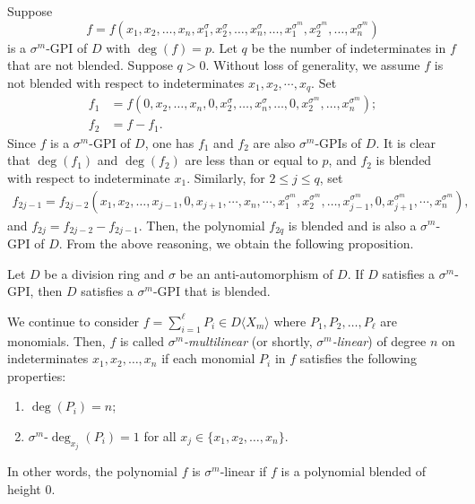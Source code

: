 \documentclass{cimart}
\begin{document}
Suppose 
\[
f=f(x_1,x_2,\dots,x_n,x_1^\sigma,x_2^\sigma,\dots,x_n^\sigma,\dots,x_1^{\sigma^m},x_2^{\sigma^m},\dots,x_n^{\sigma^m})
\]
is a $\sigma^m$-GPI of $D$ with $\deg(f)=p$. Let $q$ be the number of indeterminates in $f$ that are not blended. Suppose $q>0$. Without loss of generality, we assume $f$ is not blended with respect to indeterminates $x_1,x_2,\cdots,x_q$. Set
\begin{align*}
f_1 &= f(0,x_2,\dots,x_n,0,x_2^\sigma,\dots,x_n^\sigma,\dots,0,x_2^{\sigma^m},\dots,x_n^{\sigma^m}); \\
f_2 &= f-f_1.
\end{align*}
Since $f$ is a $\sigma^m$-GPI of $D$, one has $f_1$ and $f_2$ are also $\sigma^m$-GPIs of $D$. It is clear that $\deg(f_1)$ and $\deg(f_2)$ are less than or equal to $p$, and $f_2$ is blended with respect to indeterminate $x_1$. Similarly, for $2\leq j\leq q$, set
\begin{align*}
f_{2j-1} = f_{2j-2}(x_1,x_2,\dots,x_{j-1},0,
x_{j+1},\cdots,x_n,\cdots,x_1^{\sigma^m},x_2^{\sigma^m},\dots,x_{j-1}^{\sigma^m},0,x_{j+1}^{\sigma^m},\cdots,x_n^{\sigma^m}),
\end{align*}
and $f_{2j}=f_{2j-2}-f_{2j-1}$. Then, the polynomial $f_{2q}$ is blended and is also a $\sigma^m$-GPI of $D$. From the above reasoning, we obtain the following proposition.

\begin{proposition} 
	Let $D$ be a division ring and $\sigma$ be an anti-automorphism of $D$. If $D$ satisfies a $\sigma^m$-GPI, then $D$ satisfies a $\sigma^m$-GPI that is blended.	
\end{proposition}


We continue to consider $f = \sum_{i=1}^\ell P_i \in D\langle X_m \rangle$ where $P_1,P_2,\dots,P_\ell$ are monomials. Then, $f$ is called \textit{$\sigma^m$-multilinear} (or shortly, \textit{$\sigma^m$-linear}) of degree $n$ on indeterminates $x_1,x_2,\dots,x_n$ if each monomial $P_i$ in $f$ satisfies the following properties:
\begin{enumerate}
	\item $\deg(P_i) = n$;
	\item $\sigma^m\text{-}\deg_{x_j}(P_i) = 1$ for all $x_j \in \{x_1,x_2,\dots,x_n\}$.
\end{enumerate}
In other words, the polynomial $f$ is $\sigma^m$-linear if $f$ is a polynomial blended of height $0$.
\end{document}
